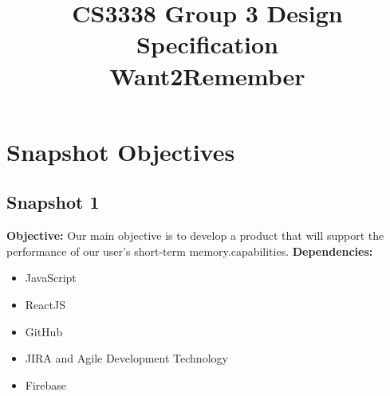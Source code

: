 \documentclass[12pt]{article}
\title{CS3338 Group 3 Design Specification\\\textbf{Want2Remember}}
\author{}
\date{}
\begin{document}
\maketitle
\thispagestyle{empty}
\newpage

\tableofcontents
\newpage

\section{Snapshot Objectives}

\subsection{Snapshot 1}
\textbf{Objective:} Our main objective is to develop a product that will support the performance of our user's short-term memory.capabilities.\newline
\textbf{Dependencies:}
\begin{itemize}
    \item JavaScript
    \item ReactJS
    \item GitHub
    \item JIRA and Agile Development Technology
    \item Firebase
\end{itemize}
\end{document}
